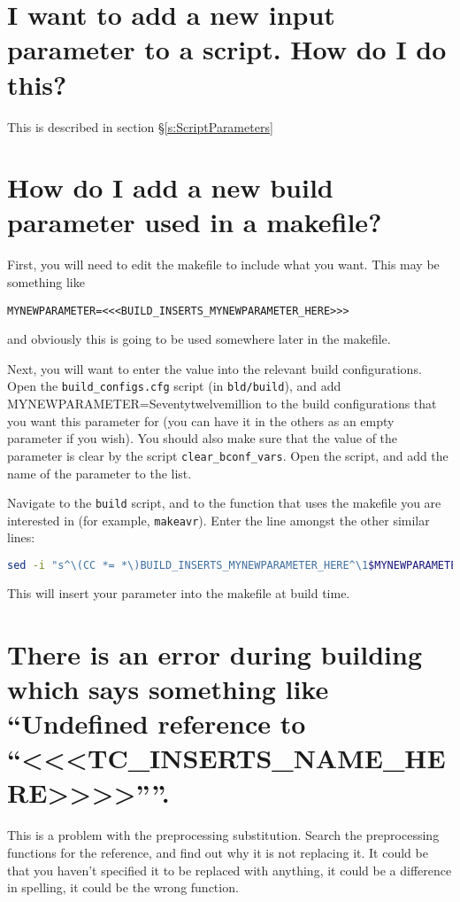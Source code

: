 \documentclass[a4paper, oneside, 11pt, titlepage, onecolumn, openright]{report}
\begin{document}
{{\section{I want to add a new input parameter to a script. How do I do this?}
			\label{s:FAQNewParams}
			This is described in section \S\ref{s:ScriptParameters}
			
\section{How do I add a new build parameter used in a makefile?}
			\label{s:FAQNewMakeParams}
			First, you will need to edit the makefile to include what you want. This may be something like
			
\begin{lstlisting}[frame=trBL, breaklines=true]
MYNEWPARAMETER=<<<BUILD_INSERTS_MYNEWPARAMETER_HERE>>>
\end{lstlisting}			

			and obviously this is going to be used somewhere later in the makefile.\newline
			
			Next, you will want to enter the value into the relevant build configurations. Open the \texttt{build\_configs.cfg} script (in \texttt{bld/build}), and add MYNEWPARAMETER=Seventytwelvemillion to the build configurations that you want this parameter for (you can have it in the others as an empty parameter if you wish).
			You should also make sure that the value of the parameter is clear by the script \texttt{clear\_bconf\_vars}. Open the script, and add the name of the parameter to the list.\newline
			
			Navigate to the \texttt{build} script, and to the function that uses the makefile you are interested in (for example, \texttt{makeavr}).
			Enter the line amongst the other similar lines:
\begin{lstlisting}[frame=trBL, breaklines=true, language=bash]			
sed -i "s^\(CC *= *\)BUILD_INSERTS_MYNEWPARAMETER_HERE^\1$MYNEWPARAMETER^" $TCPATH/$TMP_SRC_DIR/${COMPONENT}/Makefile 
\end{lstlisting}				

This will insert your parameter into the makefile at build time.

\section{There is an error during building which says something like ``Undefined reference to ``<<<TC\_INSERTS\_NAME\_HERE>>>>''''.}
			\label{s:FAQUndefinedError}
			This is a problem with the preprocessing substitution. Search the preprocessing functions for the reference, and find out why it is not replacing it. It could be that you haven't specified it to be replaced with anything, it could be a difference in spelling, it could be the wrong function.
			
}}
\end{document}
